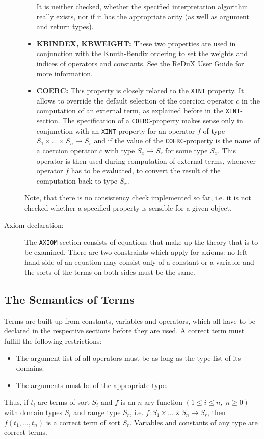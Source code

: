\begin{description}
\begin{itemize}
It is neither checked, whether the specified interpretation algorithm really exists,
nor if it has the appropriate arity (as well as argument and return types).

\item{{\bf KBINDEX, KBWEIGHT:}} These two properties are used in conjunction
with the Knuth-Bendix ordering to set the weights and indices of operators and
constants.
See the ReDuX User Guide for more information.

\item{{\bf COERC:}} This property is closely related to the {\tt XINT} property.
It allows to override the default selection of the coercion operator $c$ in
the computation of an external term, as explained before in the {\tt XINT}-section.
The specification of a {\tt COERC}-property makes sense only in conjunction
with an {\tt XINT}-property for an operator $f$ of type $S_1 \times \dots \times S_n
\rightarrow S_r$ and if the value of the {\tt COERC}-property is the name of a coercion
operator $c$ with type $S_x \rightarrow S_r$ for some type $S_x$.
This operator is then used during computation of external terms, whenever operator $f$
has to be evaluated, to convert the result of the computation back to type $S_x$.
\end{itemize}

Note, that there is no consistency check implemented so far, i.e. it is not checked
whether a specified property is sensible for a given object.

\item[Axiom declaration:]
The {\tt AXIOM}-section consists of equations that make up the theory that
is to be examined. There are two constraints which apply for axioms: no
left-hand side of an equation may consist only of a constant or a variable
and the sorts of the terms on both sides must be the same.

\end{description}


\subsection{The Semantics of Terms}
Terms are built up from constants, variables and operators, which all have to be
declared in the respective sections before they are used. A correct term
must fulfill the following restrictions:
\begin{itemize}
\item
The argument list of all operators must be as long as the type list of its
domains.
\item
The arguments must be of the appropriate type.
\end{itemize}
Thus, if $t_i$ are terms of sort $S_i$ and $f$ is an $n$-ary function
$(1 \leq i \leq n, \; n \geq 0)$
with domain types $S_i$ and range type $S_r$, i.e. $f: S_1 \times \dots \times
S_n \rightarrow S_r$, then $f(t_1,\dots,t_n)$
is a correct term of sort $S_r$. Variables and constants of any type are correct
terms.

